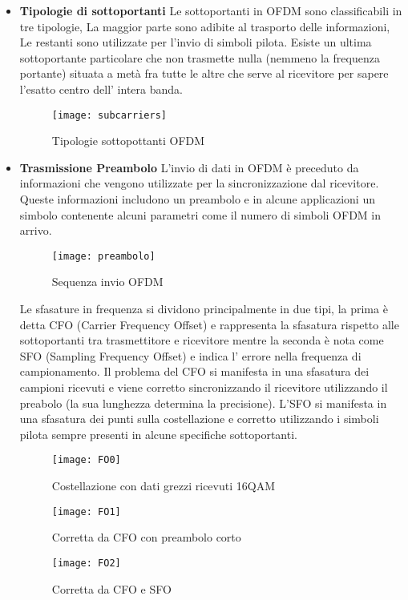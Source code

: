 \begin{itemize}
 
 \item \textbf{Tipologie di sottoportanti}
 Le sottoportanti in OFDM sono classificabili in tre tipologie, La maggior parte sono adibite al trasporto delle informazioni, Le restanti sono utilizzate per l'invio di simboli pilota. Esiste un ultima sottoportante particolare che non trasmette nulla (nemmeno la frequenza portante) situata a metà fra tutte le altre che serve al ricevitore per sapere l'esatto centro dell' intera banda.
 \begin{figure}[h]
 	\centering
 	\texttt{[image: subcarriers]}
 	\caption{Tipologie sottopottanti OFDM \cite{subcarriers}}\label{fig:1}
 \end{figure}
 \item \textbf{Trasmissione Preambolo}
	L'invio di dati in OFDM è preceduto da informazioni che vengono utilizzate per la sincronizzazione dal ricevitore. Queste informazioni includono un preambolo e in alcune applicazioni un simbolo contenente alcuni parametri come il numero di simboli OFDM in arrivo.
	\begin{figure}[h!]
		\centering
		\texttt{[image: preambolo]}
		\caption{Sequenza invio OFDM \cite{subcarriers}}\label{fig:1}
	\end{figure}
 
  Le sfasature in frequenza si dividono principalmente in due tipi, la prima è detta CFO (Carrier Frequency Offset) e rappresenta la sfasatura rispetto alle sottoportanti tra trasmettitore e ricevitore mentre la seconda è nota come SFO (Sampling Frequency Offset) e indica l' errore nella frequenza di campionamento. Il problema del CFO si manifesta in una sfasatura dei campioni ricevuti e viene corretto sincronizzando il ricevitore utilizzando il preabolo (la sua lunghezza determina la precisione). L'SFO si manifesta in una sfasatura dei punti sulla costellazione e corretto utilizzando i simboli pilota sempre presenti in alcune specifiche sottoportanti. \cite{FOOFDM}

\begin{figure}[h]
	\centering
	\begin{minipage}[b]{.30\columnwidth}
		\texttt{[image: FO0]}
		\caption{Costellazione con dati grezzi ricevuti 16QAM}\label{fig:1}
	\end{minipage}\hfill
	\begin{minipage}[b]{.30\columnwidth}
		\texttt{[image: FO1]}
		\caption{Corretta da CFO con preambolo corto}\label{fig:1}
	\end{minipage}\hfill
	\begin{minipage}[b]{.30\columnwidth}
		\texttt{[image: FO2]}
		\caption{Corretta da CFO e SFO}\label{fig:1}
	\end{minipage}\hfill
	\cite{FOOFDM}
	\end{figure}
	

\end{itemize}

